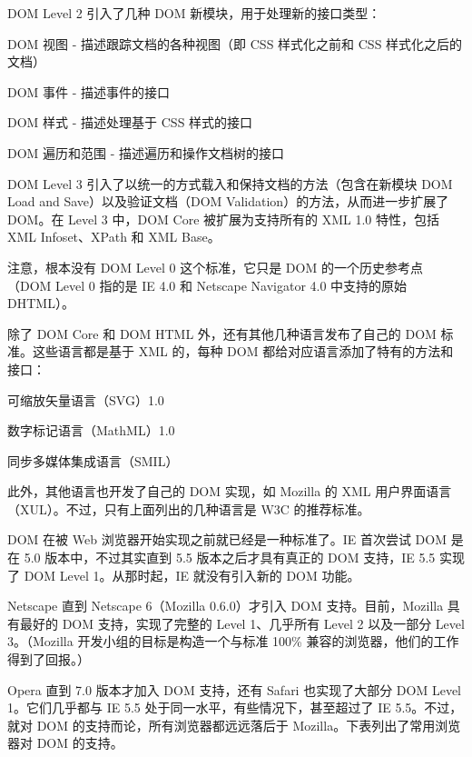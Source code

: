 DOM Level 2 引入了几种 DOM 新模块，用于处理新的接口类型：

\begin{compactitem}
\item DOM 视图 - 描述跟踪文档的各种视图（即 CSS 样式化之前和 CSS 样式化之后的文档）
\item DOM 事件 - 描述事件的接口
\item DOM 样式 - 描述处理基于 CSS 样式的接口
\item DOM 遍历和范围 - 描述遍历和操作文档树的接口
\end{compactitem}

DOM Level 3 引入了以统一的方式载入和保持文档的方法（包含在新模块 DOM Load and Save）以及验证文档（DOM Validation）的方法，从而进一步扩展了 DOM。在 Level 3 中，DOM Core 被扩展为支持所有的 XML 1.0 特性，包括 XML Infoset、XPath 和 XML Base。

注意，根本没有 DOM Level 0 这个标准，它只是 DOM 的一个历史参考点（DOM Level 0 指的是 IE 4.0 和 Netscape Navigator 4.0 中支持的原始 DHTML）。

除了 DOM Core 和 DOM HTML 外，还有其他几种语言发布了自己的 DOM 标准。这些语言都是基于 XML 的，每种 DOM 都给对应语言添加了特有的方法和接口：

\begin{compactitem}
\item 可缩放矢量语言（SVG）1.0
\item 数字标记语言（MathML）1.0
\item 同步多媒体集成语言（SMIL）
\end{compactitem}

此外，其他语言也开发了自己的 DOM 实现，如 Mozilla 的 XML 用户界面语言（XUL）。不过，只有上面列出的几种语言是 W3C 的推荐标准。

DOM 在被 Web 浏览器开始实现之前就已经是一种标准了。IE 首次尝试 DOM 是在 5.0 版本中，不过其实直到 5.5 版本之后才具有真正的 DOM 支持，IE 5.5 实现了 DOM Level 1。从那时起，IE 就没有引入新的 DOM 功能。

Netscape 直到 Netscape 6（Mozilla 0.6.0）才引入 DOM 支持。目前，Mozilla 具有最好的 DOM 支持，实现了完整的 Level 1、几乎所有 Level 2 以及一部分 Level 3。（Mozilla 开发小组的目标是构造一个与标准 100\% 兼容的浏览器，他们的工作得到了回报。）

Opera 直到 7.0 版本才加入 DOM 支持，还有 Safari 也实现了大部分 DOM Level 1。它们几乎都与 IE 5.5 处于同一水平，有些情况下，甚至超过了 IE 5.5。不过，就对 DOM 的支持而论，所有浏览器都远远落后于 Mozilla。下表列出了常用浏览器对 DOM 的支持。

